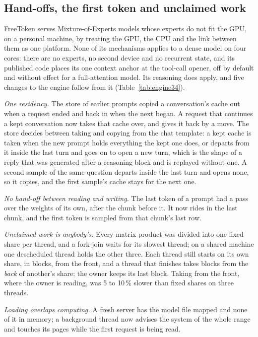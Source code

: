 \subsection{Hand-offs, the first token and unclaimed work}
\label{sec:inference:handoff}
FreeToken \cite{yang2026freetoken} serves Mixture-of-Experts models whose
experts do not fit the GPU, on a personal machine, by treating the GPU, the
CPU and the link between them as one platform. None of its mechanisms applies
to a dense model on four cores: there are no experts, no second device and no
recurrent state, and its published code places its one context anchor at the
tool-call opener, off by default and without effect for a full-attention
model. Its reasoning does apply, and five changes to the engine follow from
it (Table~\ref{tab:engine34}).

\emph{One residency.} The store of earlier prompts copied a conversation's
cache out when a request ended and back in when the next began. A request
that continues a kept conversation now takes that cache over, and gives it
back by a move. The store decides between taking and copying from the chat
template: a kept cache is taken when the new prompt holds everything the kept
one does, or departs from it inside the last turn and goes on to open a new
turn, which is the shape of a reply that was generated after a reasoning
block and is replayed without one. A second sample of the same question
departs inside the last turn and opens none, so it copies, and the first
sample's cache stays for the next one.

\emph{No hand-off between reading and writing.} The last token of a prompt
had a pass over the weights of its own, after the chunk before it. It now
rides in the last chunk, and the first token is sampled from that chunk's
last row.

\emph{Unclaimed work is anybody's.} Every matrix product was divided into one
fixed share per thread, and a fork-join waits for its slowest thread; on a
shared machine one descheduled thread holds the other three. Each thread
still starts on its own share, in blocks, from the front, and a thread that
finishes takes blocks from the \emph{back} of another's share; the owner keeps
its last block. Taking from the front, where the owner is reading, was 5 to
10\,\% slower than fixed shares on three threads.

\emph{Loading overlaps computing.} A fresh server has the model file mapped
and none of it in memory; a background thread now advises the system of the
whole range and touches its pages while the first request is being read.

